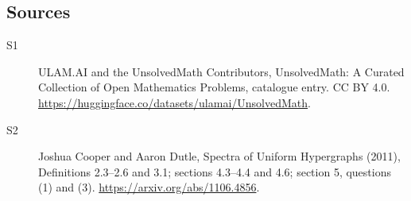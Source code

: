 \documentclass[11pt]{article}
\begin{document}
\subsection{Sources}
\begin{description}
\item[\hypertarget{source:statement:1}{S1}] ULAM.AI and the UnsolvedMath Contributors, UnsolvedMath: A Curated Collection of Open Mathematics Problems, catalogue entry. CC BY 4.0. \url{https://huggingface.co/datasets/ulamai/UnsolvedMath}.
\item[\hypertarget{source:statement:2}{S2}] Joshua Cooper and Aaron Dutle, Spectra of Uniform Hypergraphs (2011), Definitions 2.3--2.6 and 3.1; sections 4.3--4.4 and 4.6; section 5, questions (1) and (3). \url{https://arxiv.org/abs/1106.4856}.
\end{description}
\label{end:statement}
\end{document}
